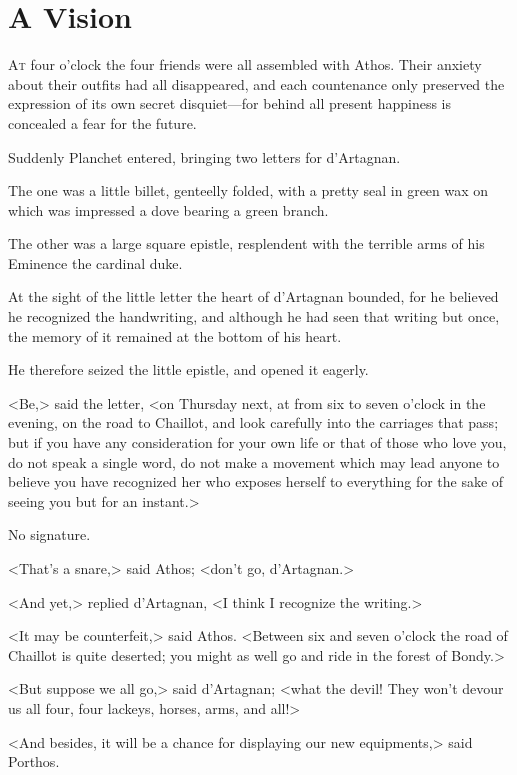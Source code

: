 
\chapter{A Vision}

\lettrine[]{A}{t} four o'clock the four friends were all assembled with Athos. Their anxiety about their outfits had all disappeared, and each countenance only preserved the expression of its own secret disquiet---for behind all present happiness is concealed a fear for the future. 

Suddenly Planchet entered, bringing two letters for d'Artagnan. 

The one was a little billet, genteelly folded, with a pretty seal in green wax on which was impressed a dove bearing a green branch. 

The other was a large square epistle, resplendent with the terrible arms of his Eminence the cardinal duke. 

At the sight of the little letter the heart of d'Artagnan bounded, for he believed he recognized the handwriting, and although he had seen that writing but once, the memory of it remained at the bottom of his heart. 

He therefore seized the little epistle, and opened it eagerly. 

<Be,> said the letter, <on Thursday next, at from six to seven o'clock in the evening, on the road to Chaillot, and look carefully into the carriages that pass; but if you have any consideration for your own life or that of those who love you, do not speak a single word, do not make a movement which may lead anyone to believe you have recognized her who exposes herself to everything for the sake of seeing you but for an instant.> 

No signature. 

<That's a snare,> said Athos; <don't go, d'Artagnan.> 

<And yet,> replied d'Artagnan, <I think I recognize the writing.> 

<It may be counterfeit,> said Athos. <Between six and seven o'clock the road of Chaillot is quite deserted; you might as well go and ride in the forest of Bondy.> 

<But suppose we all go,> said d'Artagnan; <what the devil! They won't devour us all four, four lackeys, horses, arms, and all!> 

<And besides, it will be a chance for displaying our new equipments,> said Porthos. 

